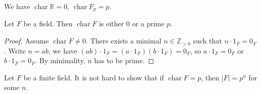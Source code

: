 \documentclass{scrartcl}
\def\Z{\mathbb{Z}}
\def\R{\mathbb{R}}
\DeclareMathOperator{\charf}{char}
\begin{document}
\begin{example}
	We have $\charf{\R}=0$, $\charf{F_p}=p$.
\end{example}
\begin{lemma}
	Let $F$ be a field. Then $\charf{F}$ is either $0$ or a prime $p$.
\end{lemma}
\begin{proof}
	Assume $\charf{F} \ne 0$. There exists a minimal $n \in \Z_{>0}$ such that $n \cdot 1_F = 0_F$. Write $n=ab$, we have $(ab) \cdot 1_F = (a\cdot 1_F)(b\cdot 1_F) = 0_F$, so $a\cdot 1_F = 0_F$ or $b\cdot 1_F = 0_F$. By minimality, $n$ has to be prime. 
\end{proof}
\begin{remark}
	Let $F$ be a finite field. It is not hard to show that if $\charf F = p$, then $|F| = p^n$ for some $n$. 
\end{remark}
\end{document}
